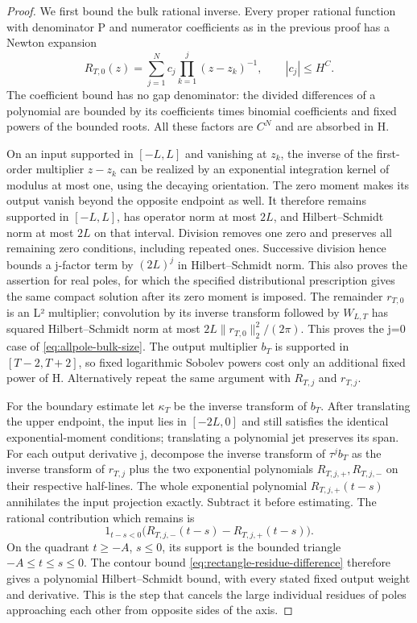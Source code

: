 \begin{proof}
We first bound the bulk rational inverse.  Every proper rational
function with denominator P and numerator coefficients as in the
previous proof has a Newton expansion
\[
        R_{T,0}(z)=\sum_{j=1}^N
              c_j\prod_{k=1}^j(z-z_k)^{-1},\qquad |c_j|\leq H^C.
\]
The coefficient bound has no gap denominator: the divided
differences of a polynomial are bounded by its coefficients times
binomial coefficients and fixed powers of the bounded roots.
All these factors are $C^N$ and are absorbed in H.

On an input supported in $[-L,L]$ and vanishing at $z_k$, the
inverse of the first-order multiplier $z-z_k$ can be realized by
an exponential integration kernel of modulus at most one, using
the decaying orientation.  The zero moment makes its output
vanish beyond the opposite endpoint as well.  It therefore
remains supported in $[-L,L]$, has operator norm at most $2L$,
and Hilbert--Schmidt norm at most $2L$ on that interval.
Division removes one zero and preserves all remaining zero
conditions, including repeated ones.  Successive division hence
bounds a j-factor term by $(2L)^j$ in Hilbert--Schmidt norm.
This also proves the assertion for real poles, for which the
specified distributional prescription gives the same compact
solution after its zero moment is imposed.
The remainder $r_{T,0}$ is an L² multiplier; convolution by its
inverse transform followed by $W_{L,T}$ has squared
Hilbert--Schmidt norm at most
$2L\|r_{T,0}\|_2^2/(2\pi)$.
This proves the j=0 case of \eqref{eq:allpole-bulk-size}.
The output multiplier $b_T$ is supported in $[T-2,T+2]$, so
fixed logarithmic Sobolev powers cost only an additional fixed
power of H.  Alternatively repeat the same argument with
$R_{T,j}$ and $r_{T,j}$.

For the boundary estimate let $\kappa_T$ be the inverse transform
of $b_T$.  After translating the upper endpoint, the input lies
in $[-2L,0]$ and still satisfies the identical exponential-moment
conditions; translating a polynomial jet preserves its span.
For each output derivative j, decompose the inverse transform
of $\tau^j b_T$ as the inverse transform of $r_{T,j}$ plus the
two exponential polynomials $R_{T,j,+},R_{T,j,-}$ on their
respective half-lines.
The whole exponential polynomial $R_{T,j,+}(t-s)$ annihilates
the input projection exactly.  Subtract it before estimating.
The rational contribution which remains is
\[
 1_{t-s<0}\bigl(R_{T,j,-}(t-s)-R_{T,j,+}(t-s)\bigr).
\]
On the quadrant $t\geq-A$, $s\leq0$, its support is the bounded
triangle $-A\leq t\leq s\leq0$.
The contour bound \eqref{eq:rectangle-residue-difference} therefore
gives a polynomial Hilbert--Schmidt bound, with every stated
fixed output weight and derivative.
This is the step that cancels the large individual residues of
poles approaching each other from opposite sides of the axis.


\end{proof}
